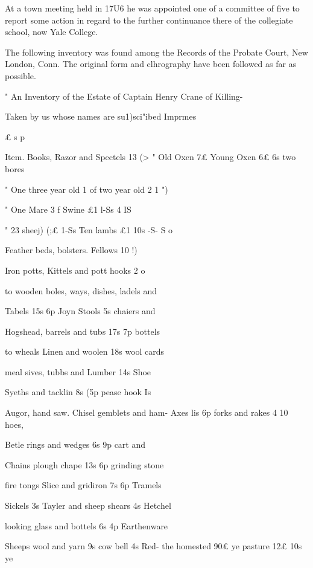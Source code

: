 \documentclass{book}
\begin{document}
At a town meeting held in 17U6 he was appointed one of a 
committee of five to report some action in regard to the further 
continuance there of the collegiate school, now Yale College. 

The following inventory was found among the Records of the 
Probate Court, New London, Conn. The original form and 
clhrography have been followed as far as possible. 

" An Inventory of the Estate of Captain Henry Crane of Killing- 

Taken by us whose names are su1)sci"ibed 
Imprmes 

£ s p 


Item. Books, Razor and Spectels  13  (> 
" Old Oxen 7£ Young Oxen 6£  6s two bores 


" One three year old 1 of two year old 2  1 ")  

" One Mare 3 f Swine £1  l-Ss 4  IS  

" 23 sheej) (;£ 1-Ss Ten lambs £1 10s -S- S o 

Feather beds, bolsters. Fellows 10  !)  










Iron potts, Kittels and pott hooks 2  o  





to wooden boles, ways, dishes, ladels and 


Tabels 15s  6p Joyn Stools 5s chaiers and 

Hogshead, barrels and tubs 17s  7p bottels 



to wheals Linen and woolen 18s wool cards 

meal sives, tubbs and Lumber 14s Shoe 

Syeths and tacklin 8s  (5p pease hook Is 

Augor, hand saw. Chisel gemblets and ham- 
Axes lis  6p forks and rakes 4  10 hoes, 

Betle rings and wedges 6s  9p cart and 


Chains plough chape 13s  6p grinding stone 


fire tongs Slice and gridiron 7s  6p Tramels 

Sickels 3s Tayler and sheep shears 4s Hetchel 


looking glass and bottels 6s  4p Earthenware 

Sheeps wool and yarn 9s cow bell 4s Red- 
the homested 90£ ye pasture 12£  10s ye 
\end{document}
